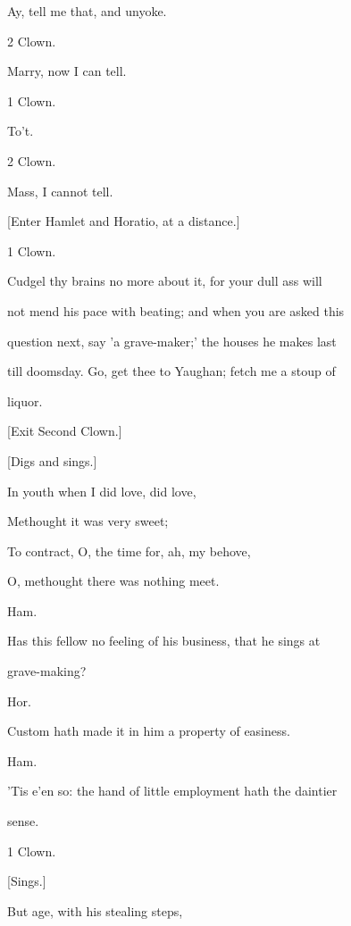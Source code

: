 \documentclass[12pt]{book}
\begin{document}
Ay, tell me that, and unyoke.



2 Clown.

Marry, now I can tell.



1 Clown.

To't.



2 Clown.

Mass, I cannot tell.



[Enter Hamlet and Horatio, at a distance.]



1 Clown.

Cudgel thy brains no more about it, for your dull ass will

not mend his pace with beating; and when you are asked this

question next, say 'a grave-maker;' the houses he makes last

till doomsday. Go, get thee to Yaughan; fetch me a stoup of

liquor.



[Exit Second Clown.]



[Digs and sings.]



   In youth when I did love, did love,

     Methought it was very sweet;

   To contract, O, the time for, ah, my behove,

     O, methought there was nothing meet.



Ham.

Has this fellow no feeling of his business, that he sings at

grave-making?



Hor.

Custom hath made it in him a property of easiness.



Ham.

'Tis e'en so: the hand of little employment hath the daintier

sense.



1 Clown.

[Sings.]

   But age, with his stealing steps,
\end{document}
